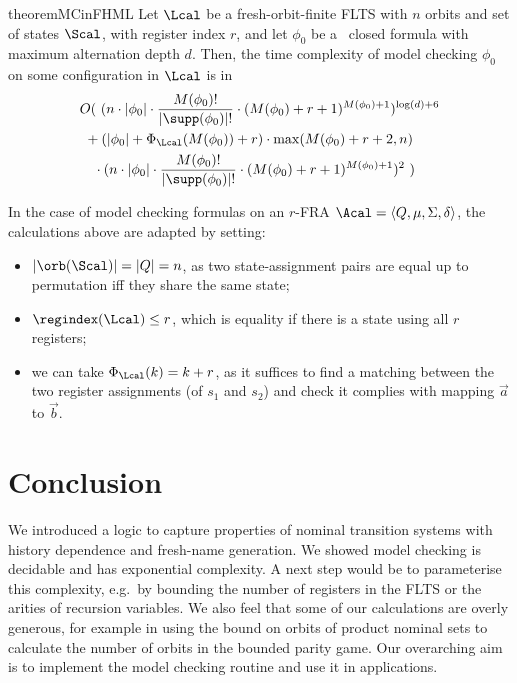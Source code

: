\begin{restatable}{theorem}{MCinFHML}\label{thm:MCinFHML}
  Let $\Lcal$ be a fresh-orbit-finite FLTS with $n$ orbits and set of states $\Scal$, with register index $r$,
  and let $\phi_0$ be a \fhml\ closed formula with maximum alternation depth $d$. 
    Then, the time complexity of model checking $\phi_0$ on some configuration in $\Lcal$ is in
	\begin{align*}
		&O(\ (n \cdot|\phi_0|\cdot \frac{M(\phi_0)!}{|\supp(\phi_0)|!}\cdot (M(\phi_0)+r + 1)^{M(\phi_0) + 1})^{\log(d) + 6}
		\\ &\ + 
		(|\phi_0| + \Phi_\Lcal(M(\phi_0)) +r)
		\cdot
		\max(M(\phi_0)+r + 2, n
		)\\&\quad \cdot 
		(n \cdot|\phi_0|\cdot \frac{M(\phi_0)!}{|\supp(\phi_0)|!}\cdot (M(\phi_0)+r + 1)^{M(\phi_0) + 1})
		^2\
		)
	\end{align*}
\end{restatable}

\begin{remark}
In the case of model checking formulas on an $r$-FRA $\Acal=\langle Q,\mu,\Sigma,\delta\rangle$, the calculations above are adapted by setting:
\begin{itemize}
\item $|\orb(\Scal)|=|Q|=n$, as two state-assignment pairs are equal up to permutation iff they share the same state;
\item $\regindex(\Lcal)\leq r$, which is equality if there is a state using all $r$  registers;
  \item we can take $\Phi_\Lcal(k)=k+r$, as it suffices to find a matching between the two register assignments (of $s_1$ and $s_2$) and check it complies with mapping $\vec a$ to $\vec b$.
  \end{itemize}
\end{remark}






\section{Conclusion}

We introduced a logic to capture properties of nominal transition systems with history dependence and fresh-name generation. We showed model checking is decidable and has exponential complexity. A next step would be to parameterise this complexity, e.g.\ by bounding the number of registers in the FLTS or the arities of recursion variables. We also feel that some of our calculations are overly generous, for example in using the bound on orbits of product nominal sets to calculate the number of orbits in the bounded parity game. Our overarching aim is to implement the model checking routine and use it in applications.


